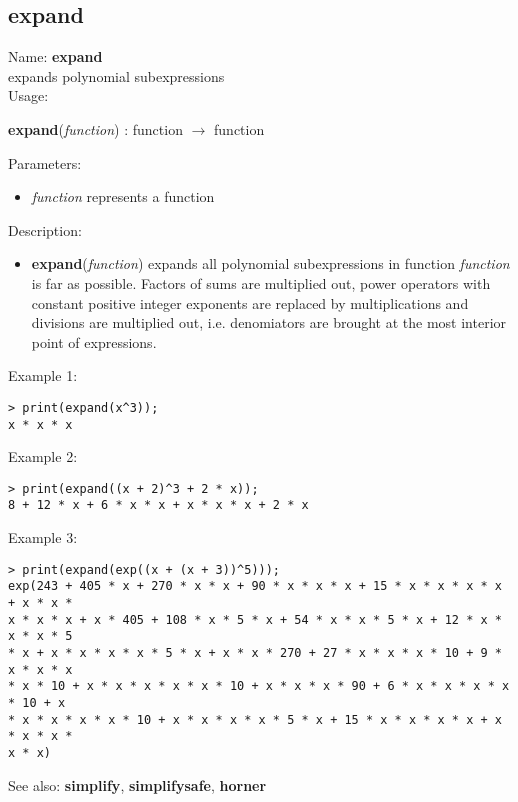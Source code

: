 \subsection{ expand }
\noindent Name: \textbf{expand}\\
expands polynomial subexpressions\\

\noindent Usage: 
\begin{center}
\textbf{expand}(\emph{function}) : \textsf{function} $\rightarrow$ \textsf{function}\\
\end{center}
Parameters: 
\begin{itemize}
\item \emph{function} represents a function
\end{itemize}
\noindent Description: \begin{itemize}

\item \textbf{expand}(\emph{function}) expands all polynomial subexpressions in function
   \emph{function} is far as possible. Factors of sums are multiplied out,
   power operators with constant positive integer exponents are replaced
   by multiplications and divisions are multiplied out, i.e. denomiators
   are brought at the most interior point of expressions.
\end{itemize}
\noindent Example 1: 
\begin{center}\begin{minipage}{15cm}\begin{Verbatim}[frame=single]
> print(expand(x^3));
x * x * x
\end{Verbatim}
\end{minipage}\end{center}
\noindent Example 2: 
\begin{center}\begin{minipage}{15cm}\begin{Verbatim}[frame=single]
> print(expand((x + 2)^3 + 2 * x));
8 + 12 * x + 6 * x * x + x * x * x + 2 * x
\end{Verbatim}
\end{minipage}\end{center}
\noindent Example 3: 
\begin{center}\begin{minipage}{15cm}\begin{Verbatim}[frame=single]
> print(expand(exp((x + (x + 3))^5)));
exp(243 + 405 * x + 270 * x * x + 90 * x * x * x + 15 * x * x * x * x + x * x * 
x * x * x + x * 405 + 108 * x * 5 * x + 54 * x * x * 5 * x + 12 * x * x * x * 5 
* x + x * x * x * x * 5 * x + x * x * 270 + 27 * x * x * x * 10 + 9 * x * x * x 
* x * 10 + x * x * x * x * x * 10 + x * x * x * 90 + 6 * x * x * x * x * 10 + x 
* x * x * x * x * 10 + x * x * x * x * 5 * x + 15 * x * x * x * x + x * x * x * 
x * x)
\end{Verbatim}
\end{minipage}\end{center}
See also: \textbf{simplify}, \textbf{simplifysafe}, \textbf{horner}
